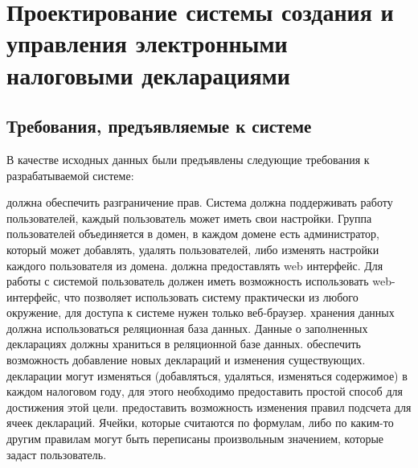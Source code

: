 \documentclass[14pt,a4paper]{reportmod}
\begin{document}
\chapter{Проектирование системы создания и управления электронными налоговыми декларациями}

\section{Требования, предъявляемые к системе}
В качестве исходных данных были предъявлены следующие требования к разрабатываемой системе:
\begin{enumerate}
   должна обеспечить разграничение прав. Система должна поддерживать работу пользователей, каждый пользователь может иметь свои настройки. Группа пользователей объединяется в домен, в каждом домене есть администратор, который может добавлять, удалять пользователей, либо изменять настройки каждого пользователя из домена.
   должна предоставлять web интерфейс. Для работы с системой пользователь должен иметь возможность использовать web-интерфейс, что позволяет использовать систему практически из любого окружение, для доступа к системе нужен только веб-браузер.
   хранения данных должна использоваться реляционная база данных. Данные о заполненных декларациях должны храниться в реляционной базе данных.
   обеспечить возможность добавление новых деклараций и изменения существующих. декларации могут изменяться (добавляться, удаляться, изменяться содержимое) в каждом налоговом году, для этого необходимо предоставить простой способ для достижения этой цели.
   предоставить возможность изменения правил подсчета для ячеек деклараций. Ячейки, которые считаются по формулам, либо по каким-то другим правилам могут быть переписаны произвольным значением, которые задаст пользователь.
\end{enumerate}
\end{document}
